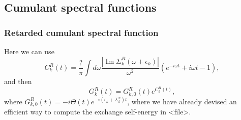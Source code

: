 
\subsection{Cumulant spectral functions}
\subsubsection{Retarded cumulant spectral function}
Here we can use 
\begin{equation}
    C_k^R(t) = \frac{?}{\pi}\int d\omega \frac{|\operatorname{Im} \Sigma_k^R(\omega+{\epsilon_k})|}{\omega^2} \left( e^{-i\omega t} + i\omega t - 1 \right),
\end{equation}
and then
\begin{equation}
    G^R_k(t) = G_{k,0}^R(t) e^{C_k^R(t)},
\end{equation}
where $G_{k,0}^R(t) = -i \Theta(t) e^{-i(\epsilon_k + \Sigma_k^x) t}$, where we have already devised an efficient way to compute the exchange self-energy in <file>.
